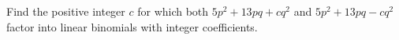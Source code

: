 Find the positive integer $c$ for which both $5p^2+13pq+cq^2$ and $5p^2+13pq-cq^2$ factor into linear binomials with integer coefficients.
